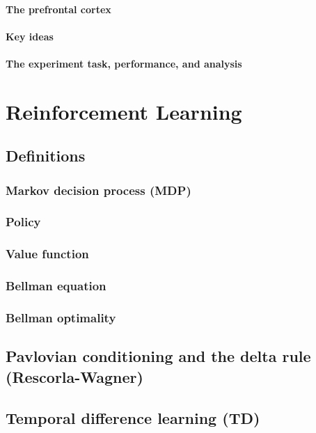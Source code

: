 \documentclass[11pt]{book} %
\begin{document}
\subsubsection{The prefrontal cortex}
\subsubsection{Key ideas}
\subsubsection{The experiment task, performance, and analysis}

%
%
%
%
%
%
%
%
%
%
%
%
%
%
%
%


\chapter{Reinforcement Learning}

\section{Definitions}
\subsection{Markov decision process (MDP)}
\subsection{Policy}
\subsection{Value function}
\subsection{Bellman equation}
\subsection{Bellman optimality}

\section{Pavlovian conditioning and the delta rule (Rescorla-Wagner)}

\section{Temporal difference learning (TD)}
\end{document}
